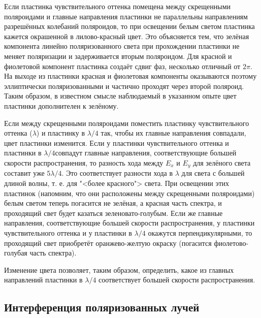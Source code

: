 \documentclass[a4paper, 12pt]{article}%
\begin{document}
	Если пластинка чувствительного оттенка помещена между скрещенными поляроидами и главные направления пластинки не параллельны
	направлениям разрешённых колебаний поляроидов, то при освещении
	белым светом пластинка кажется окрашенной в лилово-красный цвет.
	Это объясняется тем, что зелёная компонента линейно поляризованного света при прохождении пластинки не меняет поляризации и задерживается вторым поляроидом. Для красной и фиолетовой компонент
	пластинка создаёт сдвиг фаз, несколько отличный от $ 2\pi $. На выходе
	из пластинки красная и фиолетовая компоненты оказываются поэтому
	эллиптически поляризованными и частично проходят через второй поляроид. Таким образом, в известном смысле наблюдаемый в указанном
	опыте цвет пластинки дополнителен к зелёному.
	
	Если между скрещенными поляроидами поместить пластинку чувствительного оттенка
	($ \lambda $) и пластинку в $ \lambda/4 $ так, чтобы их главные
	направления совпадали, цвет пластинки изменится. Если у пластинки чувствительного оттенка и пластинки в $ \lambda/4  $совпадут главные направления, соответствующие большей скорости распространения, то разность хода между $ E_x $ и $ E_y $ для зелёного света составит уже $ 5\lambda/4 $. Это соответствует разности хода в $ \lambda $ для света с большей длиной волны, т. е. для "<более красного"> света. При освещении
	этих пластинок (напомним, что они расположены между скрещенными поляроидами) белым светом теперь погасится не зелёная, а красная
	часть спектра, и проходящий свет будет казаться зеленовато-голубым.
	Если же главные направления, соответствующие большей скорости распространения, у пластинки чувствительного оттенка и у пластинки
	в $ \lambda/4 $ окажутся перпендикулярными, то проходящий свет приобретёт
	оранжево-желтую окраску (погасится фиолетово-голубая часть спектра).
	
	Изменение цвета позволяет, таким образом, определить, какое из
	главных направлений пластинки в $ \lambda/4 $ соответствует большей скорости
	распространения.
	
	\subsection{Интерференция поляризованных лучей}
	
\end{document}
